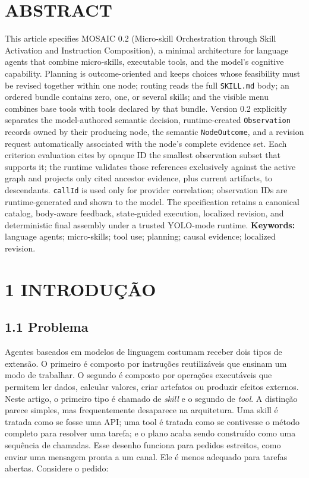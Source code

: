 \documentclass[12pt,a4paper]{article}
\begin{document}

\section*{ABSTRACT}

This article specifies MOSAIC 0.2 (Micro-skill Orchestration through Skill Activation and Instruction Composition), a minimal architecture for language agents that combine micro-skills, executable tools, and the model's cognitive capability. Planning is outcome-oriented and keeps choices whose feasibility must be revised together within one node; routing reads the full \texttt{SKILL.md} body; an ordered bundle contains zero, one, or several skills; and the visible menu combines base tools with tools declared by that bundle. Version 0.2 explicitly separates the model-authored semantic decision, runtime-created \texttt{Observation} records owned by their producing node, the semantic \texttt{NodeOutcome}, and a revision request automatically associated with the node's complete evidence set. Each criterion evaluation cites by opaque ID the smallest observation subset that supports it; the runtime validates those references exclusively against the active graph and projects only cited ancestor evidence, plus current artifacts, to descendants. \texttt{callId} is used only for provider correlation; observation IDs are runtime-generated and shown to the model. The specification retains a canonical catalog, body-aware feedback, state-guided execution, localized revision, and deterministic final assembly under a trusted YOLO-mode runtime. \textbf{Keywords:} language agents; micro-skills; tool use; planning; causal evidence; localized revision.


\section*{1 INTRODUÇÃO}

\subsection*{1.1 Problema}

Agentes baseados em modelos de linguagem costumam receber dois tipos de extensão. O primeiro é composto por instruções reutilizáveis que ensinam um modo de trabalhar. O segundo é composto por operações executáveis que permitem ler dados, calcular valores, criar artefatos ou produzir efeitos externos. Neste artigo, o primeiro tipo é chamado de\textit{ skill} e o segundo de\textit{ tool}. A distinção parece simples, mas frequentemente desaparece na arquitetura. Uma skill é tratada como se fosse uma API; uma tool é tratada como se contivesse o método completo para resolver uma tarefa; e o plano acaba sendo construído como uma sequência de chamadas. Esse desenho funciona para pedidos estreitos, como enviar uma mensagem pronta a um canal. Ele é menos adequado para tarefas abertas. Considere o pedido:
\end{document}
